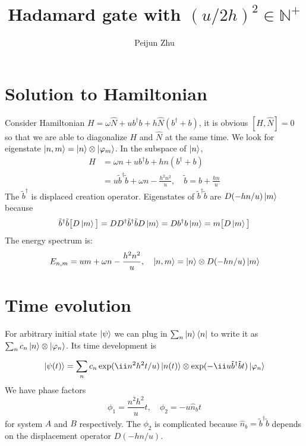 \documentclass[11pt]{article}
\begin{document}
\title{Hadamard gate with $(u/2h)^2\in \mathbb{N^+}$}
\author{Peijun Zhu}
\maketitle

\section{Solution to Hamiltonian}
Consider Hamiltonian $H=\omega\hat  N+ub^\dagger b+h\hat N(b^\dagger+b)$, it is obvious $[H, \hat N]=0$ so that we are able to diagonalize $H$ and $\hat N$ at the same time. We look for eigenstate $\ket{n, m}=\ket{n}\otimes\ket{\varphi_m}$. In the subspace of $\ket{n}$,
\begin{align}
H&=\omega n+ub^\dagger b+hn(b^\dagger+b)\\
&=u\tilde b^\dagger\tilde b+\omega n-\frac{h^2n^2}{u}, \quad\tilde b=b+\frac{hn}{u}
\end{align}
The $\tilde b^\dagger$ is displaced creation operator. Eigenstates of $\tilde b^\dagger\tilde b$ are $D(-hn/u)\ket{m}$ because
\begin{equation}\tilde b^\dagger\tilde b \big[D\ket{m}\big]=DD^\dagger\tilde b^\dagger\tilde b D\ket{m}=Db^\dagger b\ket{m}=m\big[D\ket{m}\big]\end{equation}
The energy spectrum is:
\begin{equation}E_{n, m}=um+\omega n-\frac{h^2n^2}{u}, \quad \ket{n, m}=\ket{n}\otimes D(-hn/u)\ket{m} \end{equation}

\section{Time evolution}
For arbitrary initial state $\ket{\psi}$ we can plug in $\sum_n \ket{n}\bra{n}$ to write it as $\sum_n c_n \ket{n}\otimes \ket{\varphi_n}$. Its time development is

\begin{equation}\ket{\psi(t)}=\sum_n c_n\exp(\ii n^2h^2t/u)\ket{n(t)}\otimes\exp(-\ii u\tilde{b}^\dagger\tilde{b}t)\ket{\varphi_n} \end{equation}
We have phase factors
\begin{equation}\phi_1=\frac{n^2h^2}{u}t, \quad\phi_2=-u\hat n_b t\end{equation}
for system $A$ and $B$ respectively. The $\phi_2$ is complicated because $\hat n_b = \tilde b^\dagger\tilde b$ depends on the displacement operator $D(-hn/u)$.
\end{document}
